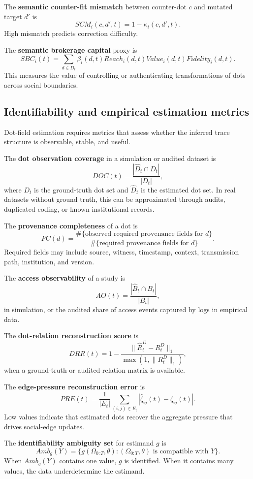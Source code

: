 \documentclass[11pt]{article}
\theoremstyle{remark}
\begin{document}
The \textbf{semantic counter-fit mismatch} between counter-dot $c$ and
mutated target $d'$ is
$$
SCM_i(c,d',t)=1-\kappa_i(c,d',t).
$$
High mismatch predicts correction difficulty.

The \textbf{semantic brokerage capital} proxy is
$$
SBC_i(t)=\sum_{d\in D_t}
\beta_i(d,t)Reach_i(d,t)Value_i(d,t)Fidelity_i(d,t).
$$
This measures the value of controlling or authenticating transformations
of dots across social boundaries.

\subsection{Identifiability and empirical estimation metrics}\label{identifiability-and-empirical-estimation-metrics}

Dot-field estimation requires metrics that assess whether the inferred
trace structure is observable, stable, and useful.

The \textbf{dot observation coverage} in a simulation or audited dataset
is
$$
DOC(t)=\frac{|\widehat D_t\cap D_t|}{|D_t|},
$$
where $D_t$ is the ground-truth dot set and $\widehat D_t$ is the
estimated dot set. In real datasets without ground truth, this can be
approximated through audits, duplicated coding, or known institutional
records.

The \textbf{provenance completeness} of a dot is
$$
PC(d)=\frac{\#\{\text{observed required provenance fields for }d\}}
{\#\{\text{required provenance fields for }d\}}.
$$
Required fields may include source, witness, timestamp, context,
transmission path, institution, and version.

The \textbf{access observability} of a study is
$$
AO(t)=\frac{|\widehat B_t\cap B_t|}{|B_t|},
$$
in simulation, or the audited share of access events captured by logs in
empirical data.

The \textbf{dot-relation reconstruction score} is
$$
DRR(t)=1-\frac{\|\widehat R_t^D-R_t^D\|_1}{\max(1,\|R_t^D\|_1)},
$$
when a ground-truth or audited relation matrix is available.

The \textbf{edge-pressure reconstruction error} is
$$
PRE(t)=\frac{1}{|E_t|}\sum_{(i,j)\in E_t}
\left|\widehat \zeta_{ij}(t)-\zeta_{ij}(t)\right|.
$$
Low values indicate that estimated dots recover the aggregate pressure
that drives social-edge updates.

The \textbf{identifiability ambiguity set} for estimand $g$ is
$$
Amb_g(Y)=\{g(\Omega_{0:T},\theta):(\Omega_{0:T},\theta)\text{ is compatible with }Y\}.
$$
When $Amb_g(Y)$ contains one value, $g$ is identified. When it contains
many values, the data underdetermine the estimand.
\end{document}
